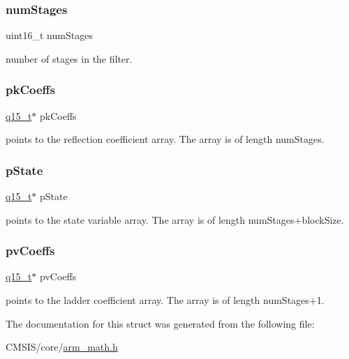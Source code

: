 \subsubsection{\texorpdfstring{numStages}{numStages}}
{\footnotesize\ttfamily uint16\+\_\+t num\+Stages}

number of stages in the filter. \mbox{\label{structarm__iir__lattice__instance__q15_a12497c299b0341c18d497f8ab3465084}} 
\subsubsection{\texorpdfstring{pkCoeffs}{pkCoeffs}}
{\footnotesize\ttfamily \mbox{\hyperlink{arm__math_8h_ab5a8fb21a5b3b983d5f54f31614052ea}{q15\+\_\+t}}$\ast$ pk\+Coeffs}

points to the reflection coefficient array. The array is of length num\+Stages. \mbox{\label{structarm__iir__lattice__instance__q15_ae29dfdb736374fcddaeaec4b7770170c}} 
\subsubsection{\texorpdfstring{pState}{pState}}
{\footnotesize\ttfamily \mbox{\hyperlink{arm__math_8h_ab5a8fb21a5b3b983d5f54f31614052ea}{q15\+\_\+t}}$\ast$ p\+State}

points to the state variable array. The array is of length num\+Stages+block\+Size. \mbox{\label{structarm__iir__lattice__instance__q15_a52866ed127c7b2a8a102e2ed1a2ebab8}} 
\subsubsection{\texorpdfstring{pvCoeffs}{pvCoeffs}}
{\footnotesize\ttfamily \mbox{\hyperlink{arm__math_8h_ab5a8fb21a5b3b983d5f54f31614052ea}{q15\+\_\+t}}$\ast$ pv\+Coeffs}

points to the ladder coefficient array. The array is of length num\+Stages+1. 

The documentation for this struct was generated from the following file\+:\begin{DoxyCompactItemize}
\item 
C\+M\+S\+I\+S/core/\mbox{\hyperlink{arm__math_8h}{arm\+\_\+math.\+h}}\end{DoxyCompactItemize}

